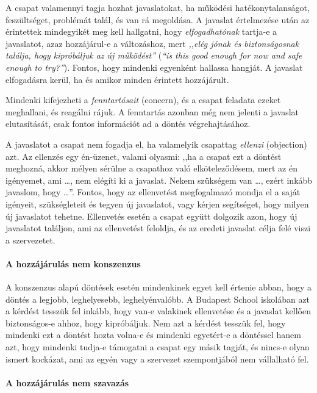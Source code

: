 A csapat valamennyi tagja hozhat javaslatokat, ha működési
hatékonytalanságot, feszültséget, problémát talál, és van rá
megoldása. A javaslat értelmezése után az érintettek mindegyikét meg
kell hallgatni, hogy \emph{elfogadhatónak} tartja-e a javaslatot, azaz
hozzájárul-e a változáshoz, mert \emph{,,elég jónak és biztonságosnak
  találja, hogy kipróbáljuk az új működést''} (\emph{``is this
  good enough for now and safe enough to try?''}). Fontos, hogy
mindenki egyenként hallassa hangját. A javaslat elfogadásra kerül, ha
és amikor minden érintett hozzájárult.

Mindenki kifejezheti a \emph{fenntartásait} (concern), és a csapat feladata ezeket meghallani, és reagálni rájuk. A fenntartás azonban még nem jelenti a javaslat elutasítását, csak fontos információt ad a döntés végrehajtásához.

A javaslatot a csapat nem fogadja el, ha valamelyik csapattag \emph{ellenzi} (objection) azt. Az ellenzés egy én-üzenet, valami olyasmi: ,,ha a csapat ezt a döntést meghozná, akkor mélyen sérülne a csapathoz való elköteleződésem, mert az én igényemet, ami \ldots{}, nem elégíti ki a javaslat. Nekem szükségem van \ldots{}, ezért inkább javaslom, hogy \ldots{}''. Fontos, hogy az ellenvetést megfogalmazó mondja el a saját igényeit, szükségleteit és tegyen új javaslatot, vagy kérjen segítséget, hogy milyen új javaslatot tehetne. Ellenvetés esetén a csapat együtt dolgozik azon, hogy új javaslatot találjon, ami az ellenvetést feloldja, és az eredeti javaslat célja felé viszi a szervezetet.

\paragraph{A hozzájárulás nem konszenzus}

A konszenzus alapú döntések esetén mindenkinek egyet kell értenie abban, hogy a döntés a legjobb, leghelyesebb, leghelyénvalóbb. A Budapest School iskolában azt a kérdést tesszük fel inkább, hogy van-e valakinek ellenvetése és a javaslat kellően biztonságos-e ahhoz, hogy kipróbáljuk. Nem azt a kérdést tesszük fel, hogy mindenki ezt a döntést hozta volna-e és mindenki egyetért-e a döntéssel hanem azt, hogy mindenki tudja-e támogatni a csapat egy másik tagját, és nincs-e olyan ismert kockázat, ami az egyén vagy a szervezet szempontjából nem vállalható fel.

\paragraph{A hozzájárulás nem szavazás}

